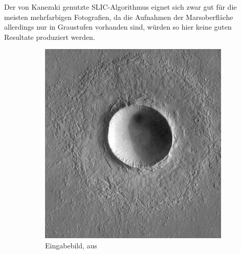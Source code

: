 Der von Kanezaki \etal genutzte SLIC-Algorithmus eignet sich zwar gut für die meisten mehrfarbigen Fotografien, da die Aufnahmen der Marsoberfläche allerdings nur in Graustufen vorhanden sind, würden so hier keine guten Resultate produziert werden.

\begin{figure}[h!]
	\centering
	\begin{subfigure}[t]{0.32\textwidth}
		\centering
		\includegraphics[width=\textwidth,keepaspectratio]{images/Gre13/Gre13_01.jpg}
		\captionsetup{format=plain,width=0.85\textwidth}
		\caption{Eingabebild, aus \cite[Kap.~7]{greeley_13}}
		\label{fig:slic_vs_tsugf_in}
	\end{subfigure}
	\hfill
	\begin{subfigure}[t]{0.32\textwidth}
		\centering

\end{subfigure}
\end{figure}
